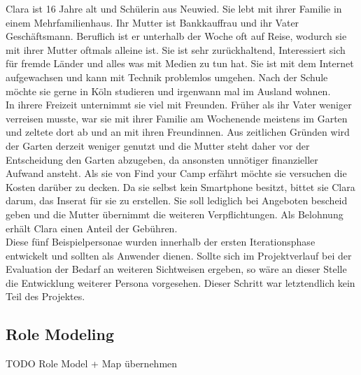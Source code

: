 Clara ist 16 Jahre alt und Schülerin aus Neuwied. 
Sie lebt mit ihrer Familie in einem Mehrfamilienhaus. Ihr Mutter ist Bankkauffrau und ihr Vater Geschäftsmann. Beruflich ist er unterhalb der Woche oft auf Reise, wodurch sie mit ihrer Mutter oftmals alleine ist.
Sie ist sehr zurückhaltend, Interessiert sich für fremde Länder und alles was mit Medien zu tun hat. Sie ist mit dem Internet aufgewachsen und kann mit Technik problemlos umgehen.
Nach der Schule möchte sie gerne in Köln studieren und irgenwann mal im Ausland wohnen.\\
In ihrere Freizeit unternimmt sie viel mit Freunden. Früher als ihr Vater weniger verreisen musste, war sie mit ihrer Familie am Wochenende meistens im Garten und zeltete dort ab und an mit ihren Freundinnen.
Aus zeitlichen Gründen wird der Garten derzeit weniger genutzt und die Mutter steht daher vor der Entscheidung den Garten abzugeben, da ansonsten unnötiger finanzieller Aufwand ansteht.
Als sie von Find your Camp erfährt möchte sie versuchen die Kosten darüber zu decken. Da sie selbst kein Smartphone besitzt, bittet sie Clara darum, das Inserat für sie zu erstellen. Sie soll lediglich bei Angeboten bescheid geben und die Mutter übernimmt die weiteren Verpflichtungen. Als Belohnung erhält Clara einen Anteil der Gebühren.\\


Diese fünf Beispielpersonae wurden innerhalb der ersten Iterationsphase entwickelt und sollten als Anwender dienen. 
Sollte sich im Projektverlauf bei der Evaluation der Bedarf an weiteren Sichtweisen ergeben, so wäre an dieser Stelle die Entwicklung weiterer Persona vorgesehen. Dieser Schritt war letztendlich kein Teil des Projektes.

\newpage
\subsection{Role Modeling}
TODO Role Model + Map übernehmen


